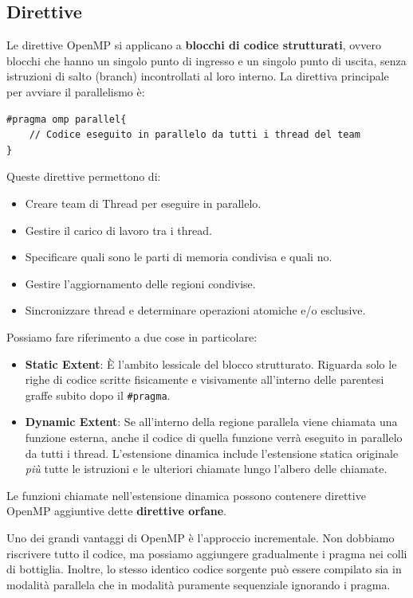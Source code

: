 \subsection{Direttive}
Le direttive OpenMP si applicano a \textbf{blocchi di codice strutturati}, ovvero blocchi che hanno un singolo punto di ingresso e un singolo punto di uscita, senza istruzioni di salto (branch) incontrollati al loro interno.
La direttiva principale per avviare il parallelismo è:
\begin{verbatim}
#pragma omp parallel{
    // Codice eseguito in parallelo da tutti i thread del team
}
\end{verbatim}
Queste direttive permettono di:
\begin{itemize}
    \item Creare team di Thread per eseguire in parallelo.
    \item Gestire il carico di lavoro tra i thread.
    \item Specificare quali sono le parti di memoria condivisa e quali no.
    \item Gestire l'aggiornamento delle regioni condivise.
    \item Sincronizzare thread e determinare operazioni atomiche e/o esclusive.
\end{itemize}
Possiamo fare riferimento a due cose in particolare:
\begin{itemize}
    \item \textbf{Static Extent}: È l'ambito lessicale del blocco strutturato. Riguarda solo le righe di codice scritte fisicamente e visivamente all'interno delle parentesi graffe subito dopo il \texttt{\#pragma}.
    \item \textbf{Dynamic Extent}: Se all'interno della regione parallela viene chiamata una funzione esterna, anche il codice di quella funzione verrà eseguito in parallelo da tutti i thread. L'estensione dinamica include l'estensione statica originale \textit{più} tutte le istruzioni e le ulteriori chiamate lungo l'albero delle chiamate.
\end{itemize}
Le funzioni chiamate nell'estensione dinamica possono contenere direttive OpenMP aggiuntive dette \textbf{direttive orfane}.

Uno dei grandi vantaggi di OpenMP è l'approccio incrementale. Non dobbiamo riscrivere tutto il codice, ma possiamo aggiungere gradualmente i pragma nei colli di bottiglia. Inoltre, lo stesso identico codice sorgente può essere compilato sia in modalità parallela che in modalità puramente sequenziale ignorando i pragma.

